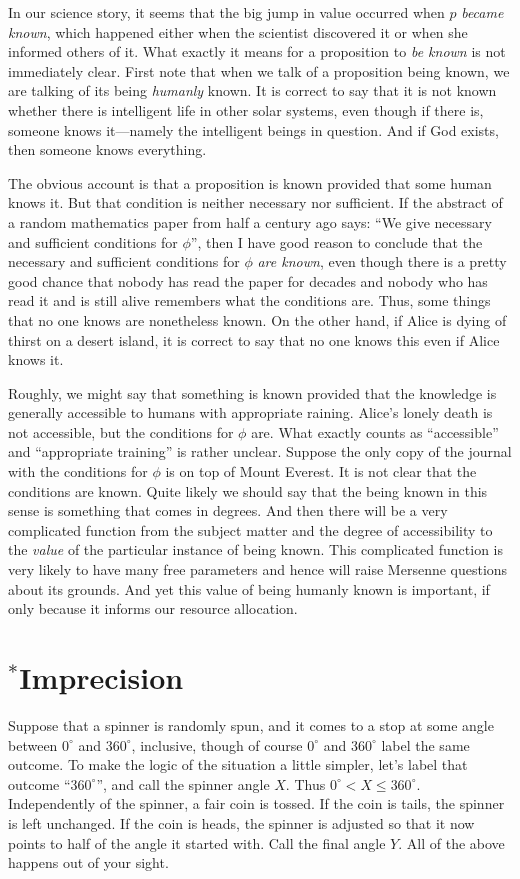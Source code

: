 In our science story, it seems that the big jump in value occurred when $p$ \textit{became known}, which happened 
either when the scientist discovered it or when she informed others of it. 
What exactly it means for a proposition to \textit{be known} is not immediately clear. 
First note that when we talk of a proposition being known, we are talking of its being \textit{humanly} known. 
It is correct to say that it is not known whether
there is intelligent life in other solar systems, even though if there is, someone knows it---namely the intelligent
beings in question. And if God exists, then someone knows everything.

The obvious account is that a proposition is known provided that some human knows it. But that condition is neither necessary nor sufficient. If the abstract of a random mathematics paper from half a century ago says: ``We give necessary and sufficient conditions for $\phi$'', then I have good reason to conclude that the necessary and sufficient conditions for $\phi$ \textit{are known}, even
though there is a pretty good chance that nobody has read the paper for decades and nobody who has read it and
is still alive remembers what the conditions are. Thus, some things that no one knows are nonetheless known. 
On the other hand, if Alice is dying of thirst on a desert island, it is correct to say that no one knows this
even if Alice knows it.

Roughly, we might say that something is known provided that the knowledge is generally accessible to humans 
with appropriate raining. Alice's lonely death is not accessible, but the conditions for $\phi$ are. What exactly counts as ``accessible'' and ``appropriate training'' is rather unclear. Suppose the only copy of the journal with the 
conditions for $\phi$ is on top of Mount Everest. It is not clear that the conditions are known. Quite likely
we should say that the being known in this sense is something that comes in degrees. And then there will be a 
very complicated function from the subject matter and the degree of accessibility to the \textit{value} of the particular
instance of being known. This complicated function is very likely to have many free parameters and hence will
raise Mersenne questions about its grounds. And yet this value of being humanly known is important, if only because it informs our resource allocation.

\section{$^*$Imprecision}
Suppose that a spinner is randomly spun, and it comes to a stop at some angle between $0^\circ$ and $360^\circ$, inclusive,
though of course $0^\circ$ and $360^\circ$ label the same outcome. To make the logic of the situation a little simpler, 
let's label that outcome ``$360^\circ$'', and call the spinner angle $X$. Thus $0^\circ < X \le 360^\circ$.
Independently of the spinner, a fair coin is tossed. If the coin is tails, the spinner is left
unchanged. If the coin is heads, the spinner is adjusted so that it now points to half of the angle it started with. Call the 
final angle $Y$. All of the above happens out of your sight.

